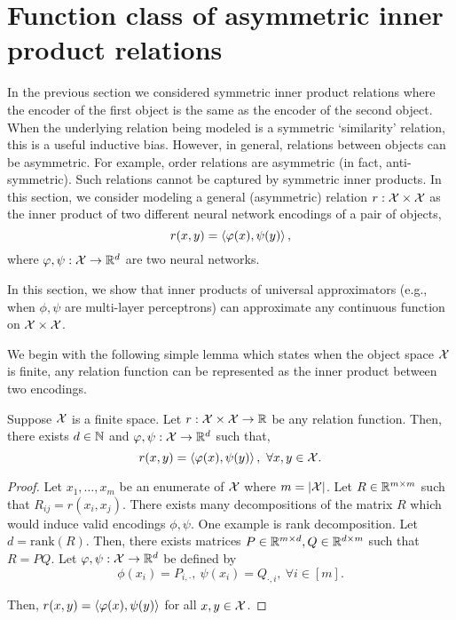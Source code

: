 \section{Function class of asymmetric inner product relations}\label{sec:asymmetric_relations}

In the previous section we considered symmetric inner product relations where the encoder of the first object is the same as the encoder of the second object. When the underlying relation being modeled is a symmetric `similarity' relation, this is a useful inductive bias. However, in general, relations between objects can be asymmetric. For example, order relations are asymmetric (in fact, anti-symmetric). Such relations cannot be captured by symmetric inner products. In this section, we consider modeling a general (asymmetric) relation $r: {\mathcal{X}} \times {\mathcal{X}}$ as the inner product of two different neural network encodings of a pair of objects,
\begin{equation}\label{eq:asymmetric_iprod_relation}
    r(x, y) = \iprod{\phi(x)}{\psi(y)},
\end{equation}
where $\varphi, \psi: {\mathcal{X}} \to \mathbb{R}^d$ are two neural networks.

In this section, we show that inner products of universal approximators (e.g., when $\phi, \psi$ are multi-layer perceptrons) can approximate any continuous function on ${\mathcal{X}} \times {\mathcal{X}}$.

We begin with the following simple lemma which states when the object space ${\mathcal{X}}$ is finite, any relation function can be represented as the inner product between two encodings.

\begin{lemma}\label{lemma:finite_space_rel}
    Suppose ${\mathcal{X}}$ is a finite space. Let $r: {\mathcal{X}} \times {\mathcal{X}} \to \mathbb{R}$ be any relation function. Then, there exists $d \in {\mathbb{N}}$ and $\varphi, \psi : {\mathcal{X}} \to \mathbb{R}^{d}$ such that,
    \begin{equation*}
        r(x, y) = \iprod{\phi(x)}{\psi(y)}, \ \forall x, y \in \calX.
    \end{equation*}
\end{lemma}

\begin{proof}
    \hphantom{~}

    Let $x_1, \ldots, x_m$ be an enumerate of ${\mathcal{X}}$ where $m = \left\lvert{\mathcal{X}}\right\rvert$. Let $R \in \mathbb{R}^{m \times m}$ such that $R_{ij} = r(x_i, x_j)$. There exists many decompositions of the matrix $R$ which would induce valid encodings $\phi, \psi$. One example is rank decomposition. Let $d = \mathrm{rank}(R)$. Then, there exists matrices $P \in \mathbb{R}^{m \times d}, Q \in \mathbb{R}^{d \times m}$ such that $R = P Q$. Let $\varphi, \psi: {\mathcal{X}} \to \mathbb{R}^{d}$ be defined by
    \begin{equation}
        \phi(x_i) = P_{i, \cdot}, \ \psi(x_i) = Q_{\cdot, i}, \ \forall i \in [m].
    \end{equation}

    Then, $r(x, y) = \left \langle \varphi(x), \psi(y) \right\rangle$ for all $x, y \in {\mathcal{X}}$.
\end{proof}

